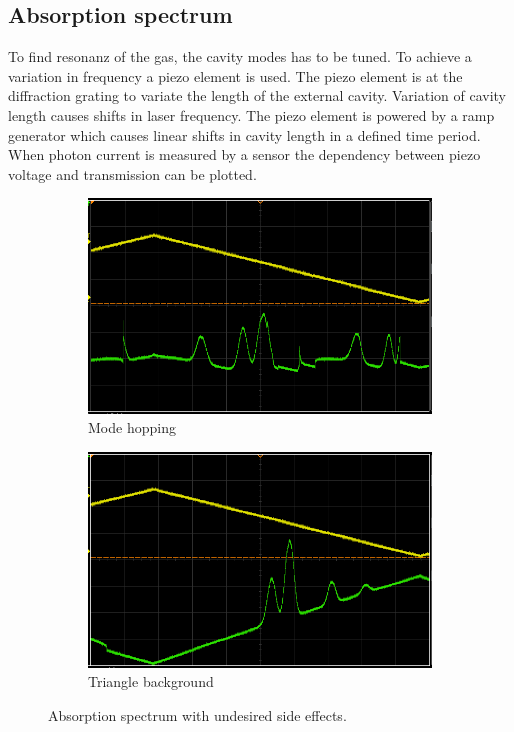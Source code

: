 \subsection{Absorption spectrum}%
\label{sub:absorbtion_spectrum}
To find resonanz of the gas, the cavity modes has to be tuned. 
To achieve a variation in frequency a piezo element is used. 
The piezo element is at the diffraction grating to variate the length of the
external cavity. 
Variation of cavity length causes shifts in laser frequency. 
The piezo element is powered by a ramp generator which causes linear shifts in
cavity length in a defined time period.
When photon current is measured by a sensor the dependency between piezo voltage and
transmission can be plotted.
\begin{figure}[h]
		\centering
		\begin{subfigure}[b]{0.49\textwidth}
				\begin{center}
				\includegraphics[width=1.0\linewidth]{./content/pictures/scope_136.png}
						\caption{Mode hopping}%
				\label{fig:piezotest}
				\end{center}
		\end{subfigure}
		\begin{subfigure}[b]{0.49\textwidth}
				\begin{center}
						\includegraphics[width=1.0\linewidth]{./content/pictures/scope_138.png}
						\caption{Triangle background}%
						\label{fig:rectangular}
				\end{center}
		\end{subfigure}
		\caption{Absorption spectrum with undesired side effects.}%
		\label{fig:}
\end{figure}
